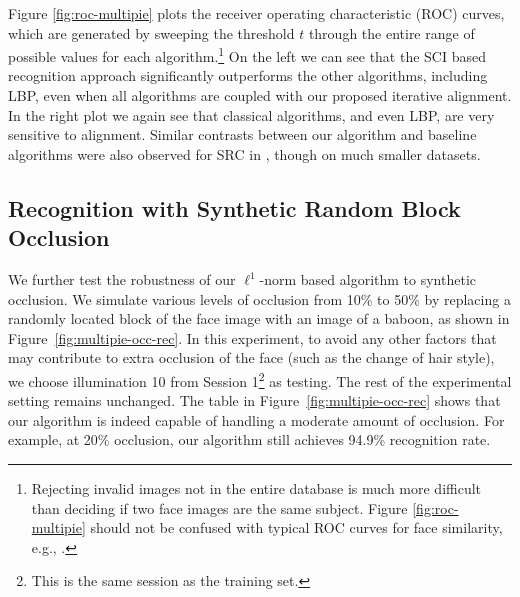\documentclass[10pt,journal,letterpaper,compsoc]{IEEEtran} %
\begin{document}
Figure \ref{fig:roc-multipie} plots the receiver operating
characteristic (ROC) curves, which are generated by sweeping
the threshold $t$ through the entire range of possible values
for each algorithm.\footnote{Rejecting invalid images not in
the entire database is much more difficult than deciding if two
face images are the same subject. Figure \ref{fig:roc-multipie}
should not be confused with typical ROC curves for face
similarity, e.g., \cite{PhillipsP2007}.} On the left we can see
that the SCI based recognition approach significantly
outperforms the other algorithms, including LBP, even when all
algorithms are coupled with our proposed iterative alignment.
In the right plot we again see that classical algorithms, and
even LBP, are very sensitive to alignment.  Similar contrasts
between our algorithm and baseline algorithms were also
observed for SRC in \cite{Wright2009-PAMI}, though on much
smaller datasets.

\subsection{Recognition with Synthetic Random Block Occlusion}

We further test the robustness of our $\ell^1$-norm based
algorithm to synthetic occlusion. We simulate various levels of
occlusion from 10\% to 50\% by replacing a randomly located
block of the face image with an image of a baboon, as shown in
Figure~\ref{fig:multipie-occ-rec}. In this experiment, to avoid
any other factors that may contribute to extra occlusion of the
face (such as the change of hair style), we choose illumination
10 from Session 1\footnote{This is the same session as the
training set.} as testing. The rest of the experimental setting
remains unchanged. The table in
Figure~\ref{fig:multipie-occ-rec} shows that our algorithm is
indeed capable of handling a moderate amount of occlusion. For
example, at 20\% occlusion, our algorithm still achieves 94.9\%
recognition rate.
\end{document}
